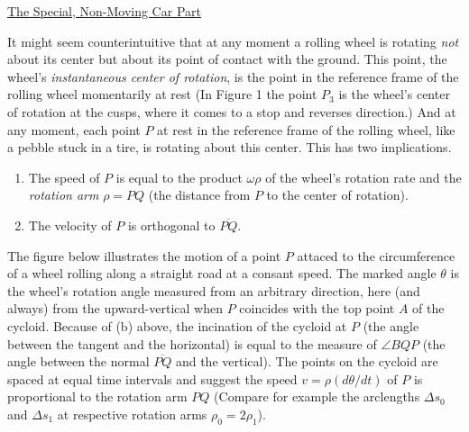 \documentclass{ximera}
\begin{document}



\href{https://www.cartalk.com/radio/puzzler/special-non-moving-car-part}{The Special, Non-Moving Car Part}



It might seem counterintuitive that at any moment a rolling wheel is rotating \emph{not} about its center but about its point of contact with the ground. This point, the wheel's \emph{instantaneous center of rotation}, is the point in the reference frame of the rolling wheel momentarily at rest (In Figure 1 the point $P_3$ is the wheel's center of rotation at the cusps, where it comes to a stop and reverses direction.) And at any moment, each point $P$ at rest in the reference frame of the rolling wheel,  like a pebble stuck in a tire, is rotating about this center. This has two implications.         %


\begin{enumerate}
\item The speed of $P$ is equal to the product $\omega \rho$ of the wheel's rotation rate and the \emph{rotation arm} $\rho = PQ$ (the distance from $P$ to the center of rotation).

\item The velocity of $P$ is orthogonal to $\overline{PQ}$.
\end{enumerate}


The figure below illustrates the motion of a point $P$ attaced to the circumference of a wheel rolling along a straight road at a consant speed. The marked angle $\theta$ is the wheel's rotation angle measured from an arbitrary direction, here (and always) from the upward-vertical when $P$ coincides with the top point $A$ of the cycloid. Because of (b) above, the incination of the cycloid at $P$ (the angle between the tangent and the horizontal) is equal to the measure of $\angle BQP$ (the angle between the normal $\overline{PQ}$ and the vertical). The points on the cycloid are spaced at equal time intervals and suggest the speed $v= \rho (d\theta/dt)$ of $P$ is proportional to the rotation arm $PQ$ (Compare for example the arclengths $\Delta s_0$ and $\Delta s_1$ at respective rotation arms $\rho_0 = 2 \rho_1$).
\end{document}
